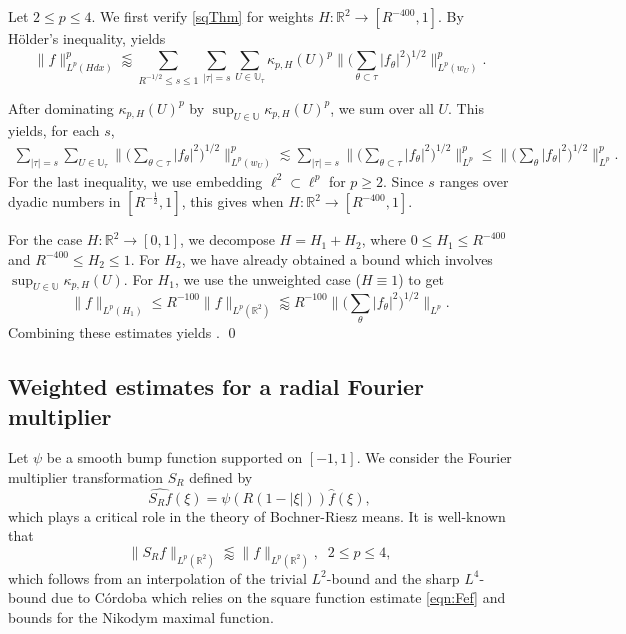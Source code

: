 \documentclass[11pt]{amsart}
\theoremstyle{definition}
\theoremstyle{remark}
\renewcommand{\hat}{\widehat}
\newcommand{\R}{\mathbb{R}}
\newcommand{\U}{\mathbb{U}}
\newcommand{\les}{\lesssim}
\newcommand{\less}{\lessapprox}
\begin{document}
Let $2\leq p\leq 4$. We first verify \eqref{sqThm} for weights $H: \R^2 \to [R^{-400},1]$.
By H\"{o}lder's inequality,  yields
\begin{equation*}
	\| f \|_{L^p(Hdx)}^p \less \sum_{R^{-1/2} \leq s\leq 1} \sum_{|\tau|=s} \sum_{U\in \U_{\tau}} \kappa_{p,H}(U)^p  \big\| \big(\sum_{\theta \subset \tau} |f_{\theta}|^2 \big)^{1/2}  \big\|_{L^p(w_{U})}^p.
\end{equation*}

After dominating $\kappa_{p,H}(U)^p$ by $\sup_{U\in \U} \kappa_{p,H}(U)^p$, we sum over all $U$. This yields, for each $s$, 
    \begin{align*}
        \sum_{|\tau|=s} \sum_{U\in \U_{\tau}} \big\| \big(\sum_{\theta \subset \tau} |f_{\theta}|^2 \big)^{1/2}  \big\|_{L^p(w_{U})}^p \les \sum_{|\tau|=s} \big\| \big(\sum_{\theta \subset \tau} |f_{\theta}|^2 \big)^{1/2}  \big\|_{L^p}^p \leq  \big\| \big(\sum_{\theta} |f_{\theta}|^2 \big)^{1/2}  \big\|_{L^p}^p.
    \end{align*}
For the last inequality, we use embedding $\ell^2\subset \ell^p$ for $p\ge2$.
Since $s$ ranges over dyadic numbers in $[R^{-\frac12},1]$, this gives  when $H: \R^2 \to [R^{-400},1]$.


For the case $H: \R^2 \to [0,1]$, we decompose $H=H_1 + H_2$, where $0\leq H_1\leq R^{-400}$ and $R^{-400} \leq H_2 \leq 1$. For $H_2$, we have already obtained a bound which involves $\sup_{U\in \U} \kappa_{p,H}(U)$. For $H_1$, we use the unweighted case ($H\equiv 1$) to get  
\[  \| f \|_{L^p(H_1)} \leq R^{-100}\| f \|_{L^p(\R^2)} \less R^{-100} \big\| \big(\sum_{\theta} |f_{\theta}|^2 \big)^{1/2}  \big\|_{L^p}. \]
Combining these estimates yields .
\qed

\subsection{Weighted estimates for a radial Fourier multiplier}
Let $\psi$ be a smooth bump function supported on $[-1,1]$. 
We consider the Fourier multiplier transformation $S_R$  defined by 
\[ \widehat{S_R f} (\xi) = \psi( R (1-|\xi|) ) \hat{f}(\xi), \]
which plays a critical role in the theory of Bochner-Riesz means. It is well-known that 
\begin{equation}\label{eqn:BR}
	\| S_R f\|_{L^p(\R^2)} \less \| f\|_{L^p(\R^2)}, \;\; 2\leq p\leq 4,
\end{equation}
which follows from an interpolation of the trivial $L^2$-bound and the sharp $L^4$-bound due to C\'ordoba \cite{Co} which relies on the square function estimate \eqref{eqn:Fef} and  bounds for the Nikodym maximal function.
\end{document}
